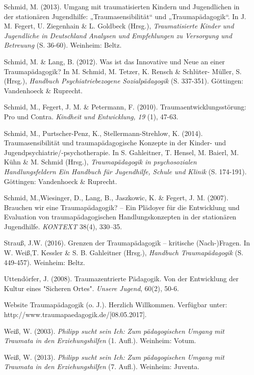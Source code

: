 \hang
Schmid, M. (2013). Umgang mit traumatisierten Kindern und Jugendlichen in der station{\"a}ren Jugendhilfe: „Traumasensibilit{\"a}t“ und „Traumap{\"a}dagogik“. In J. M. Fegert, U. Ziegenhain \& L. Goldbeck (Hrsg.), \textit{Traumatisierte Kinder und Jugendliche in Deutschland Analysen und Empfehlungen zu Versorgung und Betreuung} (S. 36-60). Weinheim: Beltz.

\hang
Schmid, M. \& Lang, B. (2012). Was ist das Innovative und Neue an einer Traumap{\"a}dagogik? In M. Schmid, M. Tetzer, K. Rensch \& Schlüter- Müller, S. (Hrsg.), \textit{Handbuch Psychiatriebezogene Sozialpädagogik} (S. 337-351). Göttingen: Vandenhoeck \& Ruprecht.

\hang
Schmid, M., Fegert, J. M. \& Petermann, F. (2010). Traumaentwicklungsstörung: Pro und Contra. \textit{Kindheit und Entwicklung, 19} (1), 47-63.

\hang
Schmid, M., Purtscher-Penz, K., Stellermann-Strehlow, K. (2014). Traumasensibilit{\"a}t und traumap{\"a}dagogische Konzepte in der Kinder- und Jugendpsychiatrie/-psychotherapie. In S. Gahleitner, T. Hensel, M. Baierl, M. K{\"u}hn \& M. Schmid (Hrsg.), \textit{Traumap{\"a}dagogik in psychosozialen Handlungsfeldern Ein Handbuch f{\"u}r Jugendhilfe, Schule und Klinik} (S. 174-191). Göttingen: Vandenhoeck \& Ruprecht.

\hang
Schmid, M.,Wiesinger, D., Lang, B., Jaszkowic, K. \& Fegert, J. M. (2007). Brauchen wir eine Traumap{\"a}dagogik? – Ein Pl{\"a}doyer f{\"u}r die Entwicklung und Evaluation von traumap{\"a}dagogischen Handlungskonzepten in der station{\"a}ren Jugendhilfe. \textit{KONTEXT} 38(4), 330–35.

\hang
Strauß, J.W. (2016). Grenzen der Traumap{\"a}dagogik – kritische (Nach-)Fragen. In W. Weiß,T. Kessler \& S. B. Gahleitner (Hrsg.), \textit{Handbuch Traumapädagogik} (S. 449-457). Weinheim: Beltz.

\hang
Uttendörfer, J. (2008). Traumazentrierte Pädagogik. Von der Entwicklung der Kultur eines "Sicheren Ortes". \textit{Unsere Jugend}, 60(2), 50-6.

\hang
Website Traumapädagogik (o. J.). Herzlich Willkommen. Verfügbar unter:\\ http://www.traumapaedagogik.de/[08.05.2017].

\hang
Weiß, W. (2003). \textit{Philipp sucht sein Ich: Zum pädagogischen Umgang mit Traumata in den Erziehungshilfen} (1. Aufl.). Weinheim: Votum.

\hang
Weiß, W. (2013). \textit{Philipp sucht sein Ich: Zum pädagogischen Umgang mit Traumata in den Erziehungshilfen} (7. Aufl.). Weinheim: Juventa.

